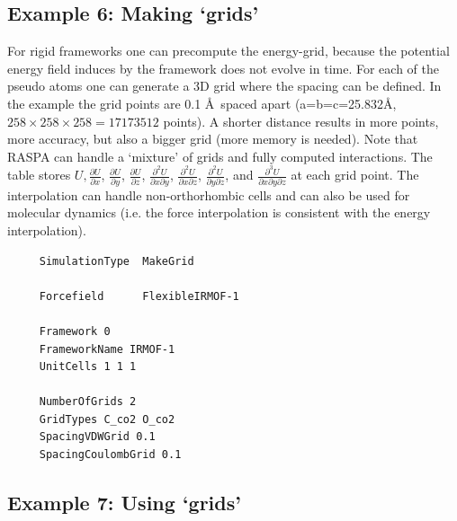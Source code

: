 \subsection*{Example 6: Making `grids'}

For rigid frameworks one can precompute the energy-grid, because the potential energy field induces by the framework does
not evolve in time. For each of the pseudo atoms one can generate a 3D grid where the spacing can be defined. In the example
the grid points are 0.1 \AA\ spaced apart (a=b=c=25.832\AA, $258\times258\times258=17173512$ points).
A shorter distance results in more points, more accuracy, but also a bigger
grid (more memory is needed). Note that RASPA can handle a `mixture' of grids and fully computed interactions.
The table stores $U,\frac{\partial U}{\partial x}$, $\frac{\partial U}{\partial y}$, $\frac{\partial U}{\partial z}$,
$\frac{\partial^2 U}{\partial x\partial y}$, $\frac{\partial^2 U}{\partial x\partial z}$, $\frac{\partial^2 U}{\partial y\partial z}$,
and $\frac{\partial^3 U}{\partial x\partial y \partial z}$ at each grid point. The interpolation can handle non-orthorhombic cells
and can also be used for molecular dynamics (i.e. the force interpolation is consistent with the energy interpolation).

\begin{tiny}
\begin{verbatim}
     SimulationType  MakeGrid

     Forcefield      FlexibleIRMOF-1

     Framework 0
     FrameworkName IRMOF-1
     UnitCells 1 1 1

     NumberOfGrids 2
     GridTypes C_co2 O_co2
     SpacingVDWGrid 0.1
     SpacingCoulombGrid 0.1
\end{verbatim}
\end{tiny}

\subsection*{Example 7: Using `grids'}

